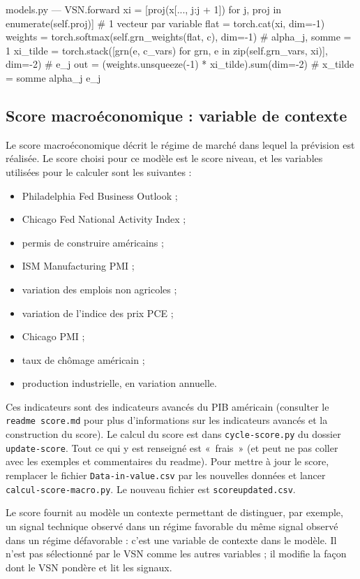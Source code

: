 \documentclass[11pt,a4paper]{article}
\renewcommand{\_}{\usorig\allowbreak}   %
\newcommand{\f}[1]{\texttt{#1}}        %
\begin{document}
\begin{code}{models.py --- VSN.forward}
xi = [proj(x[..., j:j + 1]) for j, proj in enumerate(self.proj)]   # 1 vecteur par variable
flat = torch.cat(xi, dim=-1)
weights = torch.softmax(self.grn_weights(flat, c), dim=-1)         # alpha_j, somme = 1
xi_tilde = torch.stack([grn(e, c_vars) for grn, e in zip(self.grn_vars, xi)], dim=-2)  # e_j
out = (weights.unsqueeze(-1) * xi_tilde).sum(dim=-2)               # x_tilde = somme alpha_j e_j
\end{code}

\subsection{Score macroéconomique : variable de contexte}\label{sec:score}
Le score macroéconomique décrit le régime de marché dans lequel la prévision est réalisée.
Le score choisi pour ce modèle est le score niveau, et les variables utilisées pour le
calculer sont les suivantes :
\begin{itemize}[nosep,label=-]
  \item Philadelphia Fed Business Outlook ;
  \item Chicago Fed National Activity Index ;
  \item permis de construire américains ;
  \item ISM Manufacturing PMI ;
  \item variation des emplois non agricoles ;
  \item variation de l'indice des prix PCE ;
  \item Chicago PMI ;
  \item taux de chômage américain ;
  \item production industrielle, en variation annuelle.
\end{itemize}
Ces indicateurs sont des indicateurs avancés du PIB américain (consulter le \f{readme
score.md} pour plus d'informations sur les indicateurs avancés et la construction du
score). Le calcul du score est dans \f{cycle-score.py} du dossier \f{update-score}. Tout
ce qui y est renseigné est «~frais~» (et peut ne pas coller avec les exemples et
commentaires du readme). Pour mettre à jour le score, remplacer le fichier
\f{Data-in-value.csv} par les nouvelles données et lancer \f{calcul-score-macro.py}. Le
nouveau fichier est \f{score\_updated.csv}.

Le score fournit au modèle un contexte permettant de distinguer, par exemple, un signal
technique observé dans un régime favorable du même signal observé dans un régime
défavorable : c'est une variable de contexte dans le modèle. Il n'est pas sélectionné
par le VSN comme les autres variables ; il modifie la façon dont le VSN pondère et lit
les signaux.
\end{document}
